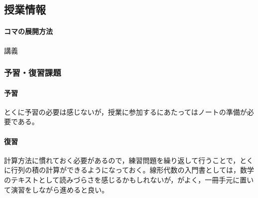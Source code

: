 \subsection{授業情報}
\paragraph{コマの展開方法}
講義
\subsubsection{予習・復習課題}
\paragraph{予習}とくに予習の必要は感じないが，授業に参加するにあたってはノートの準備が必要である。
\paragraph{復習}計算方法に慣れておく必要があるので，練習問題を繰り返して行うことで，とくに行列の積の計算ができるようになっておく。線形代数の入門書としては，数学のテキストとして読みづらさを感じるかもしれないが，\textcite{Murakami20160301}がよく，一冊手元に置いて演習をしながら進めると良い。
